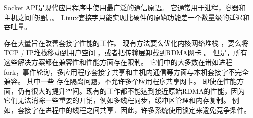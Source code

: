 
Socket API是现代应用程序中使用最广泛的通信原语。 它通常用于进程，容器和主机之间的通信。
Linux套接字只能实现比硬件的原始功能差一个数量级的延迟和吞吐量。

存在大量旨在改善套接字性能的工作。
现有方法要么优化内核网络堆栈 \cite {lin2016scalable,han2012megapipe,yasukata2016stackmap}，要么将TCP / IP堆栈移动到用户空间 \cite {jeong2014mtcp,marinos2014network,seastar,fstack,libvma}，或者把传输层卸载到RDMA网卡 \cite{rsockets,socketsdirect}。
但是，所有这些解决方案都在兼容性和性能方面存在限制。
它们中的大多数在诸如进程 fork，事件轮询，多应用程序套接字共享和主机内通信等方面与本机套接字不完全兼容。
其中一些 \cite {jeong2014mtcp}存在隔离问题，不允许多个应用程序共享网卡。
即使在性能方面，仍有很大的提升空间。现有的工作都不能达到接近原始RDMA的性能，因为它们无法消除一些重要的开销，例如多线程同步，缓冲区管理和内存复制。
例如，套接字在进程中的线程之间共享，因此，许多系统使用锁定来避免竞争条件。

